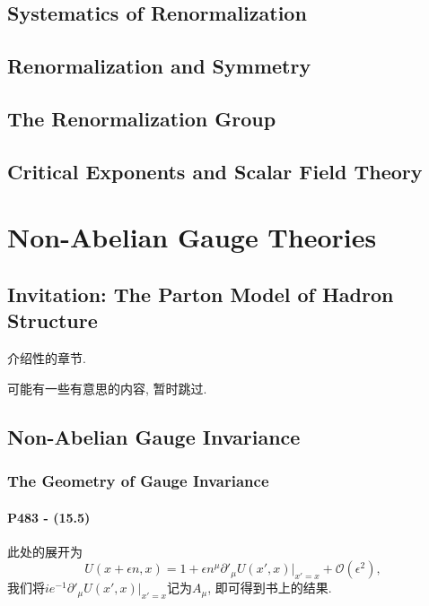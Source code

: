 \documentclass[10pt,b5paper,openany]{book}
\begin{document}
\clearpage

\chapter{Systematics of Renormalization}

\chapter{Renormalization and Symmetry}

\chapter{The Renormalization Group}

\chapter{Critical Exponents and Scalar Field Theory}

\clearpage

\part{Non-Abelian Gauge Theories}

\clearpage

\chapter{Invitation: The Parton Model of Hadron Structure}

介绍性的章节. 

可能有一些有意思的内容, 暂时跳过. 

\clearpage

\chapter{Non-Abelian Gauge Invariance}

\section{The Geometry of Gauge Invariance}

\subsection{P483 - (15.5)}

此处的展开为
\begin{equation}\label{eq: expand_of_U(y,x)}
  U(x+\epsilon n, x) = 1 + \epsilon n^{\mu} \partial'_{\mu}U(x', x)|_{x' = x} + \mathcal{O}(\epsilon^2),
\end{equation}
我们将$ie^{-1}\partial'_{\mu}U(x', x)|_{x' = x}$记为$A_{\mu}$, 即可得到书上的结果. 
\end{document}
